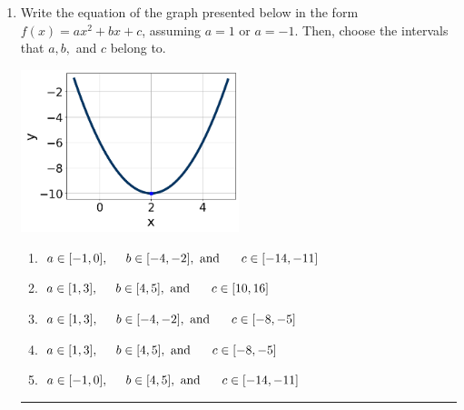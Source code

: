 \documentclass[14pt]{extbook}
\newcommand{\litem}[1]{\item#1\hspace*{-1cm}\rule{\textwidth}{0.4pt}}
\begin{document}
\begin{enumerate}
{\begin{enumerate}[label=\Alph*.]
\end{enumerate} }
\litem{
Write the equation of the graph presented below in the form $f(x)=ax^2+bx+c$, assuming  $a=1$ or $a=-1$. Then, choose the intervals that $a, b,$ and $c$ belong to.
\begin{center}
    \includegraphics[width=0.5\textwidth]{../Figures/quadraticGraphToEquationCopyB.png}
\end{center}
\begin{enumerate}[label=\Alph*.]
\item \( a \in [-1, 0], \hspace*{5mm} b \in [-4, -2], \text{ and } \hspace*{5mm} c \in [-14, -11] \)
\item \( a \in [1, 3], \hspace*{5mm} b \in [4, 5], \text{ and } \hspace*{5mm} c \in [10, 16] \)
\item \( a \in [1, 3], \hspace*{5mm} b \in [-4, -2], \text{ and } \hspace*{5mm} c \in [-8, -5] \)
\item \( a \in [1, 3], \hspace*{5mm} b \in [4, 5], \text{ and } \hspace*{5mm} c \in [-8, -5] \)
\item \( a \in [-1, 0], \hspace*{5mm} b \in [4, 5], \text{ and } \hspace*{5mm} c \in [-14, -11] \)

\end{enumerate} }
\end{enumerate}
\end{document}
